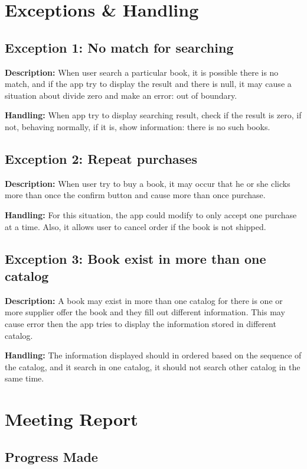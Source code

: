 \documentclass[12pt]{article}
\begin{document}
	\section{Exceptions \& Handling}


	\subsection{Exception 1: No match for searching}
 	\textbf{Description:}
 When user search a particular book, it is possible there is no match, and if the app try to display the result and there is null, it may cause a situation about divide zero and make an error: out of boundary.

	\textbf{Handling:}
When app try to display searching result, check if the result is zero, if not, behaving normally, if it is, show information: there is no such books.
 
	\subsection{Exception 2: Repeat purchases}

	\textbf{Description:}
When user try to buy a book, it may occur that he or she clicks more than once the confirm button and cause more than once purchase.

	\textbf{Handling:}
For this situation, the app could modify to only accept one purchase at a time. Also, it allows user to cancel order if the book is not shipped.
 
	\subsection{Exception 3: Book exist in more than one catalog}

	\textbf{Description:}  
A book may exist in more than one catalog for there is one or more supplier offer the book and they fill out different information. This may cause error then the app tries to display the information stored in different catalog.

	\textbf{Handling:}
The information displayed should in ordered based on the sequence of the catalog, and it search in one catalog, it should not search other catalog in the same time.




	\section{Meeting Report}
	\subsection{Progress Made}
\end{document}

